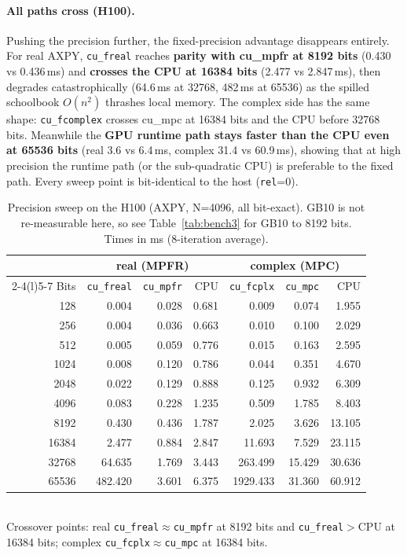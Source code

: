 \documentclass[uplatex,dvipdfmx,a4paper,11pt]{jsarticle}
\newcommand{\code}[1]{\texttt{#1}}
\begin{document}
\paragraph{All paths cross (H100).}
Pushing the precision further, the fixed-precision advantage disappears entirely.
For real AXPY, \code{cu\_freal} reaches \textbf{parity with cu\_mpfr at 8192 bits}
(0.430 vs 0.436\,ms) and \textbf{crosses the CPU at 16384 bits} (2.477 vs
2.847\,ms), then degrades catastrophically (64.6\,ms at 32768, 482\,ms at 65536)
as the spilled schoolbook $O(n^2)$ thrashes local memory. The complex side has the
same shape: \code{cu\_fcomplex} crosses cu\_mpc at 16384 bits and the CPU before
32768 bits. Meanwhile the \textbf{GPU runtime path stays faster than the CPU even
at 65536 bits} (real 3.6 vs 6.4\,ms, complex 31.4 vs 60.9\,ms), showing that at
high precision the runtime path (or the sub-quadratic CPU) is preferable to the
fixed path. Every sweep point is bit-identical to the host (\code{rel}=0).

\begin{table}[h]
\centering
\caption{Precision sweep on the H100 (AXPY, N=4096, all bit-exact). GB10 is not
re-measurable here, so see Table~\ref{tab:bench3} for GB10 to 8192 bits. Times in
ms (8-iteration average).}
\label{tab:bench3h100}
\footnotesize
\begin{tabular}{rrrr@{\hskip 1.5em}rrr}
\toprule
 & \multicolumn{3}{c}{real (MPFR)} & \multicolumn{3}{c}{complex (MPC)}\\
\cmidrule(r){2-4}\cmidrule(l){5-7}
Bits & \code{cu\_freal} & \code{cu\_mpfr} & CPU & \code{cu\_fcplx} & \code{cu\_mpc} & CPU \\
\midrule
128   & 0.004   & 0.028 & 0.681 & 0.009    & 0.074  & 1.955 \\
256   & 0.004   & 0.036 & 0.663 & 0.010    & 0.100  & 2.029 \\
512   & 0.005   & 0.059 & 0.776 & 0.015    & 0.163  & 2.595 \\
1024  & 0.008   & 0.120 & 0.786 & 0.044    & 0.351  & 4.670 \\
2048  & 0.022   & 0.129 & 0.888 & 0.125    & 0.932  & 6.309 \\
4096  & 0.083   & 0.228 & 1.235 & 0.509    & 1.785  & 8.403 \\
8192  & 0.430   & 0.436 & 1.787 & 2.025    & 3.626  & 13.105 \\
16384 & 2.477   & 0.884 & 2.847 & 11.693   & 7.529  & 23.115 \\
32768 & 64.635  & 1.769 & 3.443 & 263.499  & 15.429 & 30.636 \\
65536 & 482.420 & 3.601 & 6.375 & 1929.433 & 31.360 & 60.912 \\
\bottomrule
\end{tabular}\\[2pt]
\footnotesize Crossover points: real \code{cu\_freal}$\approx$\code{cu\_mpfr} at
8192 bits and \code{cu\_freal}$>$CPU at 16384 bits; complex
\code{cu\_fcplx}$\approx$\code{cu\_mpc} at 16384 bits.
\end{table}
\end{document}
